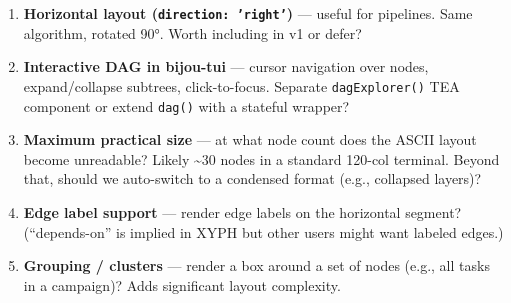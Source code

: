 \begin{enumerate}
\def\labelenumi{\arabic{enumi}.}
\tightlist
\item
  \textbf{Horizontal layout (\texttt{d\allowbreak{}i\allowbreak{}r\allowbreak{}e\allowbreak{}c\allowbreak{}t\allowbreak{}i\allowbreak{}o\allowbreak{}n\allowbreak{}:\allowbreak{} \allowbreak{}'\allowbreak{}r\allowbreak{}i\allowbreak{}g\allowbreak{}h\allowbreak{}t\allowbreak{}'})} --- useful for pipelines. Same algorithm, rotated 90°. Worth including in v1 or defer?
\item
  \textbf{Interactive DAG in bijou-tui} --- cursor navigation over nodes, expand/collapse subtrees, click-to-focus. Separate \texttt{d\allowbreak{}a\allowbreak{}g\allowbreak{}E\allowbreak{}x\allowbreak{}p\allowbreak{}l\allowbreak{}o\allowbreak{}r\allowbreak{}e\allowbreak{}r\allowbreak{}(\allowbreak{})} TEA component or extend \texttt{d\allowbreak{}a\allowbreak{}g\allowbreak{}(\allowbreak{})} with a stateful wrapper?
\item
  \textbf{Maximum practical size} --- at what node count does the ASCII layout become unreadable? Likely \textasciitilde30 nodes in a standard 120-col terminal. Beyond that, should we auto-switch to a condensed format (e.g., collapsed layers)?
\item
  \textbf{Edge label support} --- render edge labels on the horizontal segment? (``depends-on'' is implied in XYPH but other users might want labeled edges.)
\item
  \textbf{Grouping / clusters} --- render a box around a set of nodes (e.g., all tasks in a campaign)? Adds significant layout complexity.
\end{enumerate}

